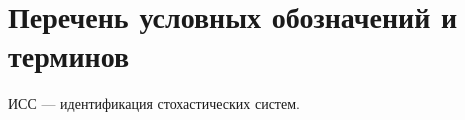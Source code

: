 \chapter*{Перечень условных обозначений и терминов}

ИСС --- идентификация стохастических систем.


